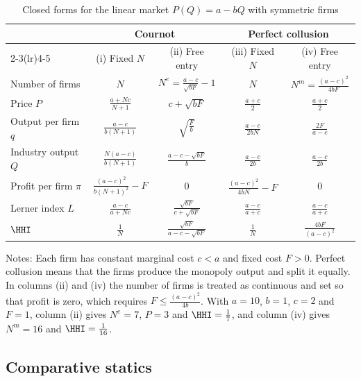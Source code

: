 \begin{table}[htbp]
\centering
\begin{threeparttable}
\caption{Closed forms for the linear market $P(Q) = a - bQ$ with symmetric firms}
\label{tab:02-linear-cournot}
\renewcommand{\arraystretch}{1.6}
\begin{tabular}{@{}lcccc@{}}
\toprule
 & \multicolumn{2}{c}{Cournot} & \multicolumn{2}{c}{Perfect collusion} \\
\cmidrule(lr){2-3}\cmidrule(lr){4-5}
 & (i) Fixed $N$ & (ii) Free entry & (iii) Fixed $N$ & (iv) Free entry \\
\midrule
Number of firms & $N$ & $N^e = \frac{a - c}{\sqrt{bF}} - 1$ & $N$ & $N^m = \frac{(a - c)^2}{4bF}$ \\
Price $P$ & $\frac{a + Nc}{N + 1}$ & $c + \sqrt{bF}$ & $\frac{a + c}{2}$ & $\frac{a + c}{2}$ \\
Output per firm $q$ & $\frac{a - c}{b(N + 1)}$ & $\sqrt{\frac{F}{b}}$ & $\frac{a - c}{2bN}$ & $\frac{2F}{a - c}$ \\
Industry output $Q$ & $\frac{N(a - c)}{b(N + 1)}$ & $\frac{a - c - \sqrt{bF}}{b}$ & $\frac{a - c}{2b}$ & $\frac{a - c}{2b}$ \\
Profit per firm $\pi$ & $\frac{(a - c)^2}{b(N + 1)^2} - F$ & $0$ & $\frac{(a - c)^2}{4bN} - F$ & $0$ \\
Lerner index $L$ & $\frac{a - c}{a + Nc}$ & $\frac{\sqrt{bF}}{c + \sqrt{bF}}$ & $\frac{a - c}{a + c}$ & $\frac{a - c}{a + c}$ \\
$\HHI$ & $\frac{1}{N}$ & $\frac{\sqrt{bF}}{a - c - \sqrt{bF}}$ & $\frac{1}{N}$ & $\frac{4bF}{(a - c)^2}$ \\
\bottomrule
\end{tabular}
\begin{tablenotes}\footnotesize
\item Notes: Each firm has constant marginal cost $c < a$ and fixed cost $F > 0$. Perfect collusion means that the
firms produce the monopoly output and split it equally. In columns (ii) and (iv) the number of firms is treated as
continuous and set so that profit is zero, which requires $F \le \frac{(a - c)^2}{4b}$. With $a = 10$, $b = 1$,
$c = 2$ and $F = 1$, column (ii) gives $N^e = 7$, $P = 3$ and $\HHI = \frac{1}{7}$, and column (iv) gives
$N^m = 16$ and $\HHI = \frac{1}{16}$.
\end{tablenotes}
\end{threeparttable}
\end{table}

\subsection{Comparative statics}\label{sec:02-cournot-cs}

